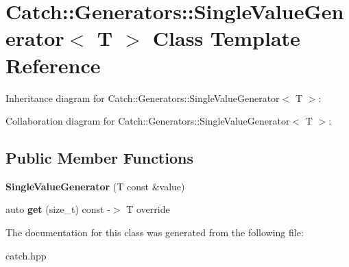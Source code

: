 \hypertarget{classCatch_1_1Generators_1_1SingleValueGenerator}{}\section{Catch\+:\+:Generators\+:\+:Single\+Value\+Generator$<$ T $>$ Class Template Reference}
\label{classCatch_1_1Generators_1_1SingleValueGenerator}


Inheritance diagram for Catch\+:\+:Generators\+:\+:Single\+Value\+Generator$<$ T $>$\+:


Collaboration diagram for Catch\+:\+:Generators\+:\+:Single\+Value\+Generator$<$ T $>$\+:
\subsection*{Public Member Functions}
\begin{DoxyCompactItemize}
\item 
{\bfseries Single\+Value\+Generator} (T const \&value)\hypertarget{classCatch_1_1Generators_1_1SingleValueGenerator_a4bed2ad14ffe04102d8135e2c82b3ace}{}\label{classCatch_1_1Generators_1_1SingleValueGenerator_a4bed2ad14ffe04102d8135e2c82b3ace}

\item 
auto {\bfseries get} (size\+\_\+t) const -\/$>$ T override\hypertarget{classCatch_1_1Generators_1_1SingleValueGenerator_ad03af3fe263136425595bfd2eec84209}{}\label{classCatch_1_1Generators_1_1SingleValueGenerator_ad03af3fe263136425595bfd2eec84209}

\end{DoxyCompactItemize}


The documentation for this class was generated from the following file\+:\begin{DoxyCompactItemize}
\item 
catch.\+hpp\end{DoxyCompactItemize}
